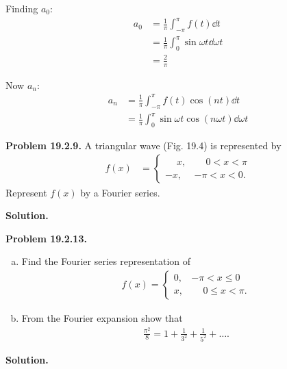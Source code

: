 \documentclass{article}
\begin{document}
Finding $a_0$:
\begin{equation*}
\begin{aligned}
    a_0 &= \frac{1}{\pi}\int_{-\pi}^\pi f(t)\dd t \\
    &= \frac{1}{\pi}\int_0^{\pi}\sin\omega t\dd \omega t \\
    &= \frac{2}{\pi}
\end{aligned}
\end{equation*}

Now $a_n$:
\begin{equation*}
\begin{aligned}
    a_n &= \frac{1}{\pi}\int_{-\pi}^\pi f(t)\cos(nt)\dd t \\
    &= \frac{1}{\pi}\int_0^\pi \sin\omega t \cos(n\omega t)\dd \omega t
\end{aligned}
\end{equation*}

\hrulefill

\textbf{Problem 19.2.9.} A triangular wave (Fig. 19.4) is represented by
\begin{equation*}
\begin{aligned}
    f(x) &=
    \begin{cases} 
        \phantom{-}x, &\phantom{-}0<x<\pi \\[1em]
        -x, &-\pi<x<0.
    \end{cases}
\end{aligned}
\end{equation*}
Represent $f(x)$ by a Fourier series.

\textbf{Solution.}

\hrulefill

\textbf{Problem 19.2.13.} 
\begin{enumerate}[(a)]
    \item Find the Fourier series representation of
    \begin{equation*}
    \begin{aligned}
        f(x) =
        \begin{cases}
            0, &-\pi<x\leq 0 \\[1em]
            x, &\phantom{-}0\leq x<\pi.
        \end{cases}
    \end{aligned}
    \end{equation*}

    \item From the Fourier expansion show that
    \begin{equation*}
    \begin{aligned}
        \frac{\pi^2}{8} = 1 + \frac{1}{3^2} + \frac{1}{5^2} + \ldots .
    \end{aligned}
    \end{equation*}
        
\end{enumerate}
\textbf{Solution.}
\end{document}
